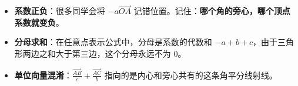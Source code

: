 \begin{trapbox}
\begin{itemize}
    \item \textbf{系数正负}：很多同学会将 $-a\vec{OA}$ 记错位置。记住：\textbf{哪个角的旁心，哪个顶点系数就变负}。
    \item \textbf{分母求和}：在任意点表示公式中，分母是系数的代数和 $-a+b+c$，由于三角形两边之和大于第三边，这个分母永远不为 0。
    \item \textbf{单位向量混淆}：$\frac{\vec{AB}}{c} + \frac{\vec{AC}}{b}$ 指向的是内心和旁心共有的这条角平分线射线。
\end{itemize}
\end{trapbox}